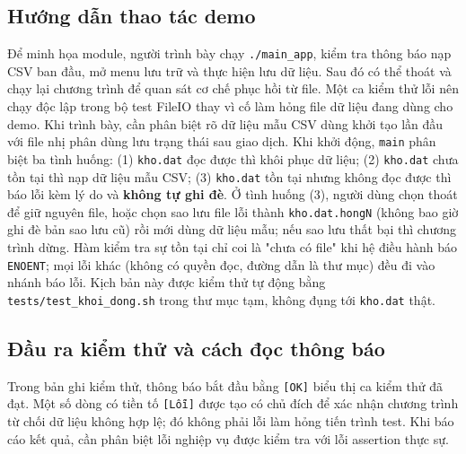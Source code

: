 \subsection{Hướng dẫn thao tác demo}
Để minh họa module, người trình bày chạy \texttt{./main\_app}, kiểm tra thông báo nạp CSV ban đầu, mở menu lưu trữ và thực hiện lưu dữ liệu. Sau đó có thể thoát và chạy lại chương trình để quan sát cơ chế phục hồi từ file. Một ca kiểm thử lỗi nên chạy độc lập trong bộ test FileIO thay vì cố làm hỏng file dữ liệu đang dùng cho demo. Khi trình bày, cần phân biệt rõ dữ liệu mẫu CSV dùng khởi tạo lần đầu với file nhị phân dùng lưu trạng thái sau giao dịch. Khi khởi động, \texttt{main} phân biệt ba tình huống: (1) \texttt{kho.dat} đọc được thì khôi phục dữ liệu; (2) \texttt{kho.dat} chưa tồn tại thì nạp dữ liệu mẫu CSV; (3) \texttt{kho.dat} tồn tại nhưng không đọc được thì báo lỗi kèm lý do và \textbf{không tự ghi đè}. Ở tình huống (3), người dùng chọn thoát để giữ nguyên file, hoặc chọn sao lưu file lỗi thành \texttt{kho.dat.hongN} (không bao giờ ghi đè bản sao lưu cũ) rồi mới dùng dữ liệu mẫu; nếu sao lưu thất bại thì chương trình dừng. Hàm kiểm tra sự tồn tại chỉ coi là "chưa có file" khi hệ điều hành báo \texttt{ENOENT}; mọi lỗi khác (không có quyền đọc, đường dẫn là thư mục) đều đi vào nhánh báo lỗi. Kịch bản này được kiểm thử tự động bằng \texttt{tests/test\_khoi\_dong.sh} trong thư mục tạm, không đụng tới \texttt{kho.dat} thật.


\subsection{Đầu ra kiểm thử và cách đọc thông báo}
Trong bản ghi kiểm thử, thông báo bắt đầu bằng \texttt{[OK]} biểu thị ca kiểm thử đã đạt. Một số dòng có tiền tố \texttt{[Lỗi]} được tạo có chủ đích để xác nhận chương trình từ chối dữ liệu không hợp lệ; đó không phải lỗi làm hỏng tiến trình test. Khi báo cáo kết quả, cần phân biệt lỗi nghiệp vụ được kiểm tra với lỗi assertion thực sự.
